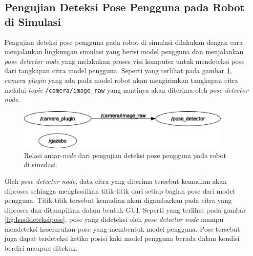 \subsection{Pengujian Deteksi Pose Pengguna pada Robot di Simulasi}
\label{subsec:deteksiposesimulasi}

Pengujian deteksi pose pengguna pada robot di simulasi dilakukan dengan cara menjalankan lingkungan simulasi yang berisi model pengguna dan menjalankan \emph{pose detector node} yang melakukan proses visi komputer untuk mendeteksi pose dari tangkapan citra model pengguna.
Seperti yang terlihat pada gambar \ref{fig:rosgraphposesimulation},
  \emph{camera plugin} yang ada pada model robot akan mengirimkan tangkapan citra melalui \emph{topic} \lstinline{/camera/image_raw} yang nantinya akan diterima oleh \emph{pose detector node}.

\begin{figure}[ht]
  \centering
  \includegraphics[width=0.95\textwidth,keepaspectratio]{gambar/rosgraph-pose-simulation.png}
  \caption{Relasi antar-\emph{node} dari pengujian deteksi pose pengguna pada robot di simulasi.}
  \label{fig:rosgraphposesimulation}
\end{figure}

Oleh \emph{pose detector node},
  data citra yang diterima tersebut kemudian akan diproses sehingga menghasilkan titik-titik dari setiap bagian pose dari model pengguna.
Titik-titik tersebut kemudian akan digambarkan pada citra yang diproses dan ditampilkan dalam bentuk GUI.
Seperti yang terlihat pada gambar \ref{fig:hasildeteksipose},
  pose yang dideteksi oleh \emph{pose detector node} mampu mendeteksi keseluruhan pose yang membentuk model pengguna.
Pose tersebut juga dapat terdeteksi ketika posisi kaki model pengguna berada dalam kondisi berdiri maupun ditekuk.

